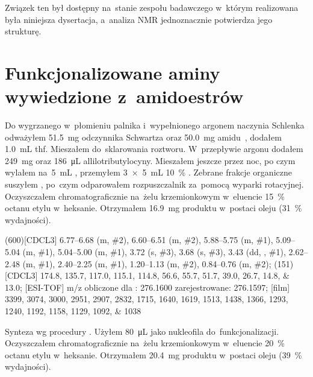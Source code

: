 Związek ten był dostępny na~stanie zespołu badawczego w~którym realizowana była niniejsza
  dysertacja, a~analiza NMR jednoznacznie potwierdza jego strukturę.


\section{Funkcjonalizowane aminy wywiedzione z~amidoestrów}\label{experimental:amidoester-products}
Do wygrzanego w~płomieniu palnika i~wypełnionego argonem naczynia Schlenka odważyłem
  \SI{51.5}{\mg} odczynnika Schwartza oraz \SI{50.0}{\mg} amidu~,
  dodałem \SI{1.0}{\mL} \gls{thf}.
Mieszałem do~sklarowania roztworu.
W~przepływie argonu dodałem \SI{249}{\mg}  oraz \SI{186}{\uL} allilotributylocyny.
Mieszałem jeszcze przez noc, po czym wylałem na~\SI{5}{\mL} ,
  przemyłem \SI[product-units = single]{3 x 5}{\mL} \SI{10}{\percent} .
Zebrane frakcje organiczne suszyłem , po~czym odparowałem rozpuszczalnik za~pomocą
  wyparki rotacyjnej.
Oczyszczałem chromatograficznie na~żelu krzemionkowym w~eluencie \SI{15}{\percent} octanu
  etylu w~heksanie.
Otrzymałem \SI{16.9}{\mg} produktu w~postaci oleju (\SI{31}{\percent} wydajności).

\begin{fullexp}
  \NMR(600)[CDCL3] \numrange{6.77}{6.68} (m, \#{2}), \numrange{6.60}{6.51} (m, \#{2}), \numrange{5.88}{5.75} (m, \#{1}), \numrange{5.09}{5.04} (m, \#{1}), \numrange{5.04}{5.00} (m, \#{1}), \num{3.72} (s, \#{3}), \num{3.68} (s, \#{3}), \num{3.43} (dd, , \#{1}), \numrange{2.62}{2.48} (m, \#{1}), \numrange{2.40}{2.25} (m, \#{1}), \numrange{1.20}{1.13} (m, \#{2}), \numrange{0.84}{0.76} (m, \#{2});
  (151)[CDCL3] \numlist{174.8; 135.7; 117.0; 115.1; 114.8; 56.6; 55.7; 51.7; 39.0; 26.7; 14.8; 13.0};
  [ESI-TOF] m/z obliczone dla : \num{276.1600} zarejestrowane: \num{276.1597};
  [film] \numlist{3399; 3074; 3000; 2951; 2907; 2832; 1715; 1640; 1619; 1513; 1438; 1366; 1293; 1240; 1192; 1158; 1129; 1092; 1038}
\end{fullexp}

Synteza wg procedury .
Użyłem \SI{80}{\uL}  jako nukleofila do~funkcjonalizacji.
Oczyszczałem chromatograficznie na~żelu krzemionkowym w~eluencie \SI{20}{\percent} octanu
  etylu w~heksanie.
Otrzymałem \SI{20.4}{\mg} produktu w~postaci oleju (\SI{39}{\percent} wydajności).

